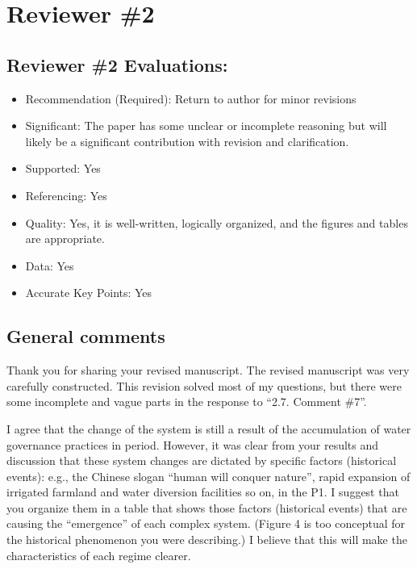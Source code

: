 \section{Reviewer \#2}\label{reviewer_2}

\subsection*{Reviewer \#2 Evaluations:}

\begin{itemize}
    \item Recommendation (Required): Return to author for minor revisions
    \item Significant: The paper has some unclear or incomplete reasoning but will likely be a significant contribution with revision and clarification.
    \item Supported: Yes
    \item Referencing: Yes
    \item Quality: Yes, it is well-written, logically organized, and the figures and tables are appropriate.
    \item Data: Yes
    \item Accurate Key Points: Yes
\end{itemize}

\subsection*{General comments}

\RC{} Thank you for sharing your revised manuscript. The revised manuscript was very carefully constructed. This revision solved most of my questions, but there were some incomplete and vague parts in the response to ``2.7. Comment \#7''.

\RC*{} I agree that the change of the system is still a result of the accumulation of water governance practices in period. However, it was clear from your results and discussion that these system changes are dictated by specific factors (historical events): e.g., the Chinese slogan ``human will conquer nature'', rapid expansion of irrigated farmland and water diversion facilities so on, in the P1. I suggest that you organize them in a table that shows those factors (historical events) that are causing the ``emergence'' of each complex system. (Figure 4 is too conceptual for the historical phenomenon you were describing.) I believe that this will make the characteristics of each regime clearer.

